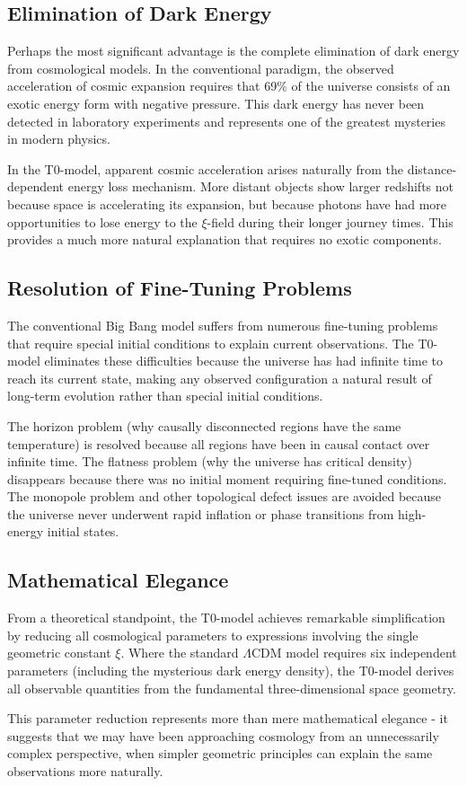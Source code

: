	\subsection{Elimination of Dark Energy}
	
	Perhaps the most significant advantage is the complete elimination of dark energy from cosmological models. In the conventional paradigm, the observed acceleration of cosmic expansion requires that 69\% of the universe consists of an exotic energy form with negative pressure. This dark energy has never been detected in laboratory experiments and represents one of the greatest mysteries in modern physics.
	
	In the T0-model, apparent cosmic acceleration arises naturally from the distance-dependent energy loss mechanism. More distant objects show larger redshifts not because space is accelerating its expansion, but because photons have had more opportunities to lose energy to the $\xi$-field during their longer journey times. This provides a much more natural explanation that requires no exotic components.
	
	\subsection{Resolution of Fine-Tuning Problems}
	
	The conventional Big Bang model suffers from numerous fine-tuning problems that require special initial conditions to explain current observations. The T0-model eliminates these difficulties because the universe has had infinite time to reach its current state, making any observed configuration a natural result of long-term evolution rather than special initial conditions.
	
	The horizon problem (why causally disconnected regions have the same temperature) is resolved because all regions have been in causal contact over infinite time. The flatness problem (why the universe has critical density) disappears because there was no initial moment requiring fine-tuned conditions. The monopole problem and other topological defect issues are avoided because the universe never underwent rapid inflation or phase transitions from high-energy initial states.
	
	\subsection{Mathematical Elegance}
	
	From a theoretical standpoint, the T0-model achieves remarkable simplification by reducing all cosmological parameters to expressions involving the single geometric constant $\xi$. Where the standard $\Lambda$CDM model requires six independent parameters (including the mysterious dark energy density), the T0-model derives all observable quantities from the fundamental three-dimensional space geometry.
	
	This parameter reduction represents more than mere mathematical elegance - it suggests that we may have been approaching cosmology from an unnecessarily complex perspective, when simpler geometric principles can explain the same observations more naturally.
